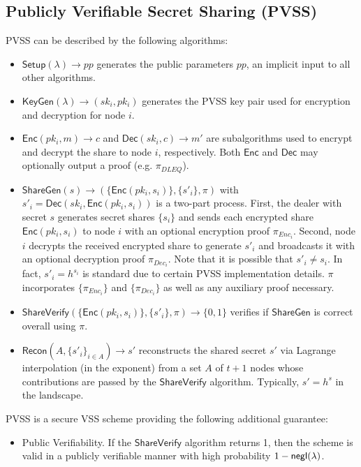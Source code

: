 \subsection{Publicly Verifiable Secret Sharing (PVSS)}
\label{appendix:pvss}
PVSS can be described by the following algorithms:
\begin{itemize}
    \item $\mathsf{Setup}(\lambda) \rightarrow pp$ generates the public parameters $pp$, an implicit input to all other algorithms.
    \item $\mathsf{KeyGen}(\lambda) \rightarrow (sk_i, pk_i)$ generates the PVSS key pair used for encryption and decryption for node $i$.
    \item $\mathsf{Enc}(pk_i, m) \rightarrow c$ and $\mathsf{Dec}(sk_i, c) \rightarrow m'$ are subalgorithms used to encrypt and decrypt the share to node $i$, respectively. Both $\mathsf{Enc}$ and $\mathsf{Dec}$ may optionally output a proof (e.g. $\pi_{DLEQ}$).
    \item $\mathsf{ShareGen}(s) \rightarrow (\{\mathsf{Enc}(pk_i, s_i)\}, \{s'_i\}, \pi)$ with $s'_i = \mathsf{Dec}(sk_i, \mathsf{Enc}(pk_i, s_i))$ is a two-part process. First, the dealer with secret $s$ generates secret shares $\{s_i\}$ and sends each encrypted share $\mathsf{Enc}(pk_i, s_i)$ to node $i$ with an optional encryption proof $\pi_{Enc_{i}}$. Second, node $i$ decrypts the received encrypted share to generate $s'_i$ and broadcasts it with an optional decryption proof $\pi_{Dec_{i}}$. Note that it is possible that $s'_i \neq s_i$. In fact, $s'_i = h^{s_i}$ is standard due to certain PVSS implementation details. $\pi$ incorporates $\{\pi_{Enc_{i}}\}$ and $\{\pi_{Dec_{i}}\}$ as well as any auxiliary proof necessary.
    \item $\mathsf{ShareVerify}(\{\mathsf{Enc}(pk_i, s_i)\}, \{s'_i\}, \pi) \rightarrow \{0, 1\}$ verifies if $\mathsf{ShareGen}$ is correct overall using $\pi$.
    \item $\mathsf{Recon}(A, \{s'_i\}_{i \in A}) \rightarrow s'$ reconstructs the shared secret $s'$ via Lagrange interpolation (in the exponent) from a set $A$ of $t + 1$ nodes whose contributions are passed by the $\mathsf{ShareVerify}$ algorithm. Typically, $s' = h^s$ in the landscape.
\end{itemize}

PVSS is a secure VSS scheme providing the following additional guarantee:
\begin{itemize}
    \item Public Verifiability. If the $\mathsf{ShareVerify}$ algorithm returns 1, then the scheme is valid in a publicly verifiable manner with high probability $1 - \mathsf{negl}(\lambda)$.\\
\end{itemize}

